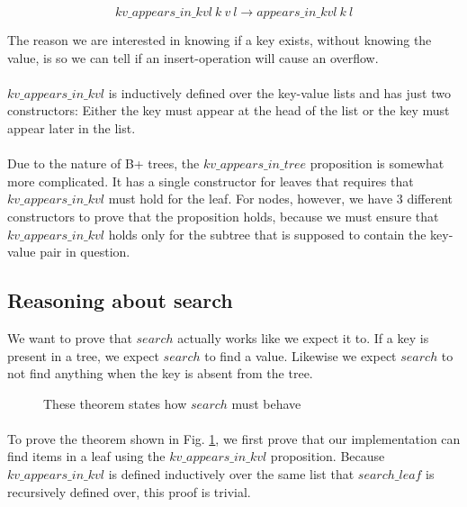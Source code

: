 \begin{equation}
  kv\_appears\_in\_kvl~k~v~l \rightarrow appears\_in\_kvl~k~l
  \label{eq:kv_appear_impl_appear}
\end{equation}

The reason we are interested in knowing if a key exists, without knowing the value, is so we can tell if an insert-operation will cause an overflow.

\paragraph{}
$kv\_appears\_in\_kvl$ is inductively defined over the key-value lists and has just two constructors: Either the key must appear at the head of the list or the key must appear later in the list.

\paragraph{}
Due to the nature of B+ trees, the $kv\_appears\_in\_tree$ proposition is somewhat more complicated. It has a single constructor for leaves that requires that $kv\_appears\_in\_kvl$ must hold for the leaf. For nodes, however, we have 3 different constructors to prove that the proposition holds, because we must ensure that $kv\_appears\_in\_kvl$ holds only for the subtree that is supposed to contain the key-value pair in question.

\subsection{Reasoning about search}
We want to prove that $search$ actually works like we expect it to. If a key is present in a tree, we expect $search$ to find a value. Likewise we expect $search$ to not find anything when the key is absent from the tree.

\begin{figure}
  
  \caption{These theorem states how $search$ must behave}
  \label{fig:search_works}
\end{figure}

\paragraph{}
To prove the theorem shown in Fig. \ref{fig:search_works}, we first prove that our implementation can find items in a leaf using the $kv\_appears\_in\_kvl$ proposition. Because $kv\_appears\_in\_kvl$ is defined inductively over the same list that $search\_leaf$ is recursively defined over, this proof is trivial.

